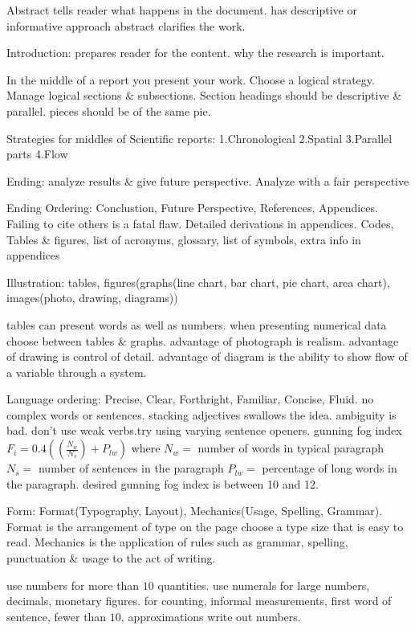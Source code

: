 \documentclass[10pt,landscape]{article}
\begin{document}
\begin{multicols*}{3}
Abstract tells reader what happens in the document. has descriptive or informative approach
abstract clarifies the work.

Introduction: prepares reader for the content. why the research is important.

In the middle of a report you present your work. Choose a logical strategy.
Manage logical sections \& subsections. Section headings should be descriptive \& parallel.
pieces should be of the same pie.

Strategies for middles of Scientific reports: 1.Chronological 2.Spatial 3.Parallel parts
4.Flow

Ending: analyze results \& give future perspective. Analyze with a fair perspective

Ending Ordering: Conclustion, Future Perspective, References, Appendices.
Failing to cite others is a fatal flaw. Detailed derivations in appendices. Codes, Tables \& figures, list of acronyms, glossary, list of symbols, extra info in appendices

Illustration: tables, figures(graphs(line chart, bar chart, pie chart, area chart), images(photo, drawing, diagrams)) 

tables can present words as well as numbers. when presenting numerical data choose between tables \& graphs.
advantage of photograph is realism. advantage of drawing is control of detail.
advantage of diagram is the ability to show flow of a variable through a system.

Language ordering: Precise, Clear, Forthright, Familiar, Concise, Fluid.
no complex words or sentences. stacking adjectives swallows the idea. ambiguity is bad.
don't use weak verbs.try using varying sentence openers.
gunning fog index $F_i = 0.4 ((\frac{N_w}{N_s})+P_{lw})$ where $N_w=$ number of words in typical paragraph
$N_s=$ number of sentences in the paragraph $P_{lw}=$ percentage of long words in the paragraph.
desired gunning fog index is between 10 and 12.

Form: Format(Typography, Layout), Mechanics(Usage, Spelling, Grammar).
Format is the arrangement of type on the page choose a type size that is easy to read.
Mechanics is the application of rules such as grammar, spelling, punctuation \& usage to the act
of writing.

use numbers for more than $10$ quantities.
use numerals for large numbers, decimals, monetary figures. 
for counting, informal measurements, first word of sentence, fewer than $10$, approximations write out numbers.


\end{multicols*}
\end{document}

